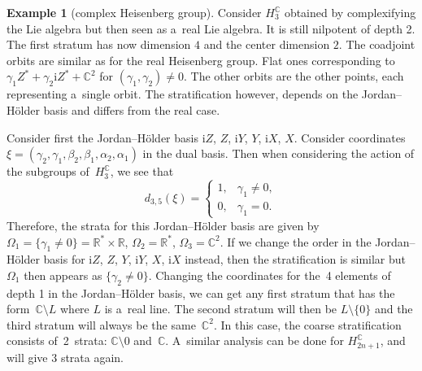 \documentclass[pdftex]{sigma}
\newcommand{\ii}{\mathrm{i}} %
\newcommand{\R}{\mathbb R} %
\newcommand{\CC}{\mathbb C} %
\numberwithin{equation}{section}
\theoremstyle{definition}
\newtheorem{ex}[thm]{Example}
\begin{document}
\begin{ex}[complex Heisenberg group]\label{Ex: Complex Heisenberg group}
 Consider $H_{3}^{\CC}$ obtained by complexifying the Lie algebra but then seen as a~real Lie algebra. It is still nilpotent of depth 2. The first stratum has now dimension $4$ and the center dimension $2$. The coadjoint orbits are similar as for the real Heisenberg group. Flat ones corresponding to $\gamma_1Z^* +\gamma_2\ii Z^* + \CC^2$ for $(\gamma_1,\gamma_2)\neq 0$. The other orbits are the other points, each representing a~single orbit. The stratification however, depends on the Jordan--H\"older basis and differs from the real case.

 Consider first the Jordan--H\"older basis $\ii Z$, $Z$, $\ii Y$, $Y$, $\ii X$, $X $. Consider coordinates $\xi = (\gamma_2,\gamma_1,\beta_2,\beta_1,\alpha_2,\alpha_1)$
 in the dual basis. Then when considering the action of the subgroups of~$H_{3}^{\CC}$, we see that
 \[d_{3,5}(\xi) = \begin{cases}
 1,&\gamma_1 \neq 0 ,\\
 0,&\gamma_1 = 0.
 \end{cases}\]
 Therefore, the strata for this Jordan--H\"older basis are given by $
 \Omega_1 = \{\gamma_1\neq 0\} = \R^*\times \R$, $
 \Omega_2 = \R^*$, $
 \Omega_3 = \CC^2$.
 If we change the order in the Jordan--H\"older basis for $\ii Z$, $Z$, $Y$, $\ii Y$, $X$, $\ii X $ instead, then the stratification is similar but $\Omega_1$ then appears as $\{\gamma_2\neq 0\}$. Changing the coordinates for the~4 elements of depth 1 in the Jordan--H\"older basis, we can get any first stratum that has the form~${\CC \setminus L}$ where $L$ is a~real line. The second stratum will then be $L\setminus \{0\}$ and the third stratum will always be the same~$\CC^2$. In this case, the coarse stratification consists of~2~strata: $\CC \setminus0$ and~$\CC$. A~similar analysis can be done for $H_{2n+1}^{\CC}$, and will give 3 strata again.
\end{ex}
\end{document}
